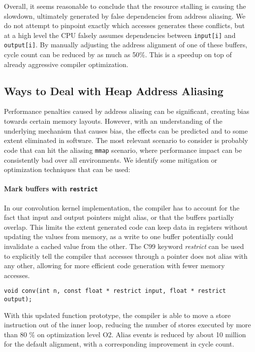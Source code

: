 \documentclass{acm_proc_article-sp}
\begin{document}
Overall, it seems reasonable to conclude that the resource stalling is causing the slowdown, ultimately generated by false dependencies from address aliasing.
We do not attempt to pinpoint exactly which accesses generates these conflicts, but at a high level the CPU falsely assumes dependencies between \texttt{input[i]} and \texttt{output[i]}.
By manually adjusting the address alignment of one of these buffers, cycle count can be reduced by as much as 50\%.
This is a speedup on top of already aggressive compiler optimization.


\subsection{Ways to Deal with Heap Address Aliasing}
Performance penalties caused by address aliasing can be significant, creating bias towards certain memory layouts.
However, with an understanding of the underlying mechanism that causes bias, the effects can be predicted and to some extent eliminated in software.
The most relevant scenario to consider is probably code that can hit the aliasing \texttt{mmap} scenario, where performance impact can be consistently bad over all environments.
We identify some mitigation or optimization techniques that can be used:

\paragraph{Mark buffers with \texttt{restrict}}
In our convolution kernel implementation, the compiler has to account for the fact that input and output pointers might alias, or that the buffers partially overlap.
This limits the extent generated code can keep data in registers without updating the values from memory, as a write to one buffer potentially could invalidate a cached value from the other.
The C99 keyword \emph{restrict} can be used to explicitly tell the compiler that accesses through a pointer does not alias with any other, allowing for more efficient code generation with fewer memory accesses.
\begin{lstlisting}[breaklines=true]
    void conv(int n, const float * restrict input, float * restrict output);
\end{lstlisting}
With this updated function prototype, the compiler is able to move a store instruction out of the inner loop, reducing the number of stores executed by more than 80 \% on optimization level O2.
Alias events is reduced by about 10 million for the default alignment, with a corresponding improvement in cycle count. %
\end{document}
